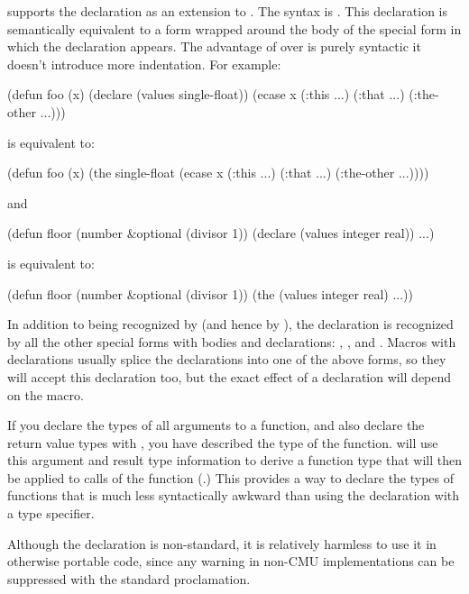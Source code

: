 {\cmucl{} supports the  declaration as an extension to \clisp.  The
syntax is .
This declaration is semantically equivalent to a  form
wrapped around the body of the special form in which the
 declaration appears.  The advantage of 
over  is purely syntactic \dash{} it doesn't introduce
more indentation.  For example:
\begin{example}
(defun foo (x)
  (declare (values single-float))
  (ecase x
    (:this ...)
    (:that ...)
    (:the-other ...)))
\end{example}
is equivalent to:
\begin{example}
(defun foo (x)
  (the single-float
       (ecase x
         (:this ...)
         (:that ...)
         (:the-other ...))))
\end{example}
and
\begin{example}
(defun floor (number &optional (divisor 1))
  (declare (values integer real))
  ...)
\end{example}
is equivalent to:
\begin{example}
(defun floor (number &optional (divisor 1))
  (the (values integer real)
       ...))
\end{example}
In addition to being recognized by  (and hence by ), the
 declaration is recognized by all the other special forms with bodies
and declarations: , ,  and .  Macros with
declarations usually splice the declarations into one of the above forms, so
they will accept this declaration too, but the exact effect of a 
declaration will depend on the macro.

If you declare the types of all arguments to a function, and also declare the
return value types with , you have described the type of the
function.  \python{} will use this argument and result type information to derive
a function type that will then be applied to calls of the function (.)  This provides a way to declare the types of functions
that is much less syntactically awkward than using the  declaration
with a  type specifier.

Although the  declaration is non-standard, it is relatively harmless
to use it in otherwise portable code, since any warning in non-CMU
implementations can be suppressed with the standard 
proclamation.

}
